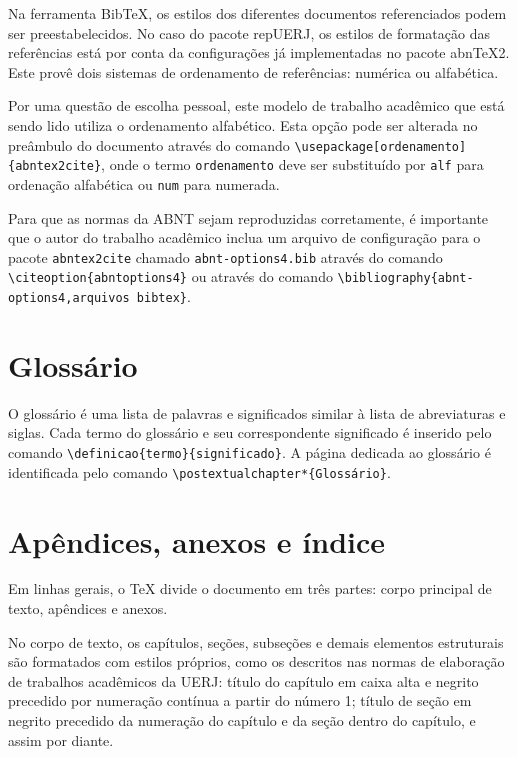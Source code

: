 \documentclass[a4paper,12pt,oneside,onecolumn,final,fleqn]{repUERJ}
\begin{document}
Na ferramenta \textsf{BibTeX}, os estilos dos diferentes documentos referenciados podem ser preestabelecidos. No caso do pacote \textsf{repUERJ}, os estilos de formatação das referências está por conta da configurações já implementadas no pacote \textsf{abnTeX2}. Este provê dois sistemas de ordenamento de referências: numérica ou alfabética.

Por uma questão de escolha pessoal, este modelo de trabalho acadêmico que está sendo lido utiliza o ordenamento alfabético. Esta opção pode ser alterada no preâmbulo do documento através do comando \texttt{\textbackslash usepackage[ordenamento]\{abntex2cite\}}, onde o termo \texttt{ordenamento} deve ser substituído por \texttt{alf} para ordenação alfabética ou \texttt{num} para numerada.

Para que as normas da ABNT sejam reproduzidas corretamente, é importante que o autor do trabalho acadêmico inclua um arquivo de configuração para o pacote \texttt{abntex2cite} chamado \texttt{abnt-options4.bib} através do comando \texttt{\textbackslash citeoption\{abnt\-options4\}} ou através do comando \texttt{\textbackslash bibliography\{abnt-options4,arquivos bibtex\}}.

\section{Glossário}

O glossário é uma lista de palavras e significados similar à lista de abreviaturas e siglas. Cada termo do glossário e seu correspondente significado é inserido pelo comando \texttt{\textbackslash definicao\{termo\}\{significado\}}. A página dedicada ao glossário é identificada pelo comando \texttt{\textbackslash postextualchapter*\{Glossário\}}.

\section{Apêndices, anexos e índice}

Em linhas gerais, o \textsf{TeX} divide o documento em três partes: corpo principal de texto, apêndices e anexos.

No corpo de texto, os capítulos, seções, subseções e demais elementos estruturais são formatados com estilos próprios, como os descritos nas normas de elaboração de trabalhos acadêmicos da UERJ: título do capítulo em caixa alta e negrito precedido por numeração contínua a partir do número 1; título de seção em negrito precedido da numeração do capítulo e da seção dentro do capítulo, e assim por diante.
\end{document}
